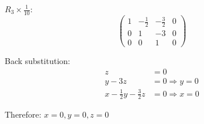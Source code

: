 $R_3 \times \frac{1}{10}$:
\[
	\left(\begin{array}{ccc|c}
			1 & -\frac{1}{2} & -\frac{3}{2} & 0 \\
			0 & 1           & -3           & 0 \\
			0 & 0           & 1            & 0
		\end{array}\right)
\]

Back substitution:
\begin{align*}
	z &= 0 \\
	y - 3z &= 0 \Rightarrow y = 0 \\
	x - \frac{1}{2}y - \frac{3}{2}z &= 0 \Rightarrow x = 0
\end{align*}

Therefore: $x = 0, y = 0, z = 0$